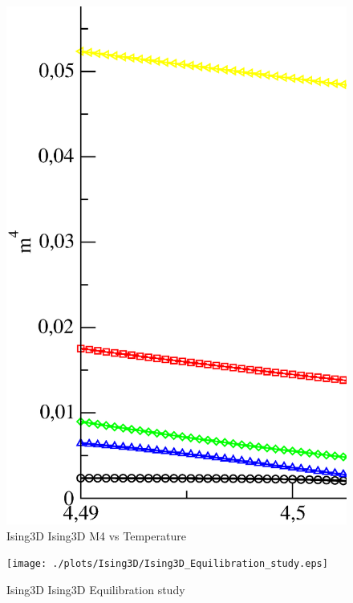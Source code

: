 \begin{figure}[!htpb]
  \centering
  \includegraphics[width=\textwidth]{./plots/Ising3D/Ising3D_M4_vs_Temperature.eps}
  \caption{Ising3D Ising3D M4 vs Temperature}
\end{figure}

\begin{figure}[!htpb]
  \centering
  \texttt{[image: ./plots/Ising3D/Ising3D\_Equilibration\_study.eps]}
  \caption{Ising3D Ising3D Equilibration study}
\end{figure}

